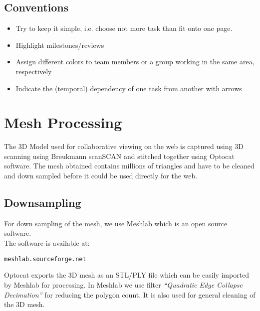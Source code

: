 \documentclass[twoside,12pt,a4paper]{article}
\begin{document}


\subsection{Conventions} %
\label{sub:conventions}

\begin{itemize}
	\item Try to keep it simple, i.e. choose not more task than fit onto one page.
	\item Highlight milestones/reviews
	\item Assign different colors to team members or a group working in the same area, respectively
	\item Indicate the (temporal) dependency of one task from another with arrows
\end{itemize}




\newpage

\section{Mesh Processing} %
\label{sec:Mesh processing}

The 3D Model used for collaborative viewing on the web is captured using 3D scanning using Breukmann scanSCAN and stitched together using Optocat software. The mesh obtained contains millions of triangles and have to be cleaned and down sampled before it could be used directly for the web.


\subsection{Downsampling} %
\label{sub:downsampling}
For down sampling of the mesh, we use Meshlab which is an open source software.\\
The software is available at:
\begin{lstlisting} 	 
meshlab.sourceforge.net
\end{lstlisting}
Optocat exports the 3D mesh as an STL/PLY file which can be easily imported by Meshlab for processing. In Meshlab we use filter \textit{“Quadratic Edge Collapse Decimation”} for reducing the polygon count. It is also used for general cleaning of the 3D mesh.

\end{document}
